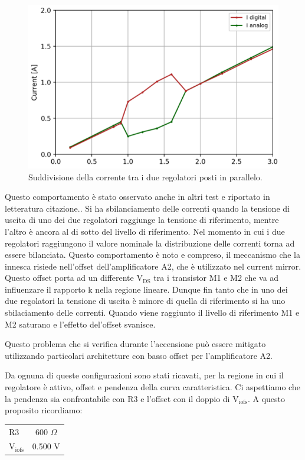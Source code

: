 \begin{figure}
\centering
\includegraphics[scale=.4]{Immagini/CurrentSharing}
\caption{Suddivisione della corrente tra i due regolatori posti in parallelo.}%
\label{CurrentSharing}
\end{figure}
Questo comportamento è stato osservato anche in altri test e riportato in letteratura citazione.. 
Si ha sbilanciamento delle correnti quando  la tensione di uscita di uno dei due regolatori raggiunge la tensione di riferimento, mentre l'altro è ancora al di sotto del livello di riferimento. 
Nel momento in cui i due regolatori raggiungono il valore nominale la distribuzione delle correnti torna ad essere bilanciata. 
Questo comportamento è noto e compreso, il meccanismo che la innesca risiede nell'offset dell'amplificatore A2, che è utilizzato nel current mirror. 
Questo offset porta ad un differente $\mathrm{V_{DS}}$ tra i transistor M1 e M2 che va ad influenzare il rapporto k nella regione lineare. Dunque fin tanto che in uno dei due regolatori la tensione di uscita è minore di quella di riferimento si ha uno sbilaciamento delle correnti. 
Quando viene raggiunto il livello di riferimento M1 e M2 saturano e l'effetto del'offset svanisce.

Questo problema che si verifica durante l'accensione può essere mitigato utilizzando particolari architetture con basso offset per l'amplificatore A2.

Da ognuna di queste configurazioni sono stati ricavati, per la regione in cui il regolatore è attivo, offset e pendenza della curva caratteristica. Ci aspettiamo che la pendenza sia confrontabile con R3 e l'offset con il doppio di $\mathrm{V_{iofs}}$. A questo proposito ricordiamo: 
\begin{center}
\begin{tabular}{lc}
\hline
$\mathrm{R3}$ & 600 $\Omega$ \\%
$\mathrm{V_{iofs}}$ & 0.500 V\\ 
\hline
\end{tabular}
\end{center}

